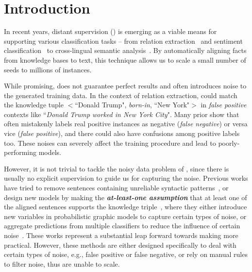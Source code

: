 \section{Introduction}

In recent years, distant supervision (\DS) is emerging as a viable means for supporting various classification tasks -- from relation extraction~\cite{mintz2009distant} and sentiment classification~\cite{go2009twitter} to cross-lingual semantic
analysis~\cite{fang2016learning}. By automatically aligning
facts from knowledge bases to text, this technique allows us to scale a small number of seeds to millions of instances.



While promising, \DS does not guarantee perfect results and often introduces noise to the
generated training data. In the context of relation extraction, \DS could match the knowledge tuple $<$``Donald Trump",
\emph{born-in}, ``New York"$>$  in \emph{false positive} contexts like ``\emph{Donald Trump worked in New York City}".
Many prior  show that \DS often mistakenly labels real positive instances as negative (\emph{false negative}) or
versa vice (\emph{false positive}), and there could also have confusions among positive labels too. These noises can
severely affect the training
procedure and lead to poorly-performing models.

However, it is not trivial to tackle the noisy data problem of \DS, since there is usually no explicit supervision to guide us for capturing the noise.
Previous works have tried to remove sentences containing unreliable syntactic patterns~\cite{takamatsu2012reducing},  or design new models by making the \textbf{\textit{at-least-one assumption}}  that at least one of the aligned sentences supports the knowledge triple~\cite{riedel2010modeling}, where they either introduce new variables in probabilistic graphic models to capture certain types of noise, or aggregate predictions from multiple classifiers to reduce the influence of certain noise~\cite{hoffmann2011knowledge,surdeanu2012multi,ritter2013modeling,min2013distant}. These works represent a substantial leap forward towards making \DS more practical. However, these methods are either designed specifically to deal with certain types of noise, e.g., false positive or false negative, or  rely on manual rules to filter noise, thus are unable to scale.

